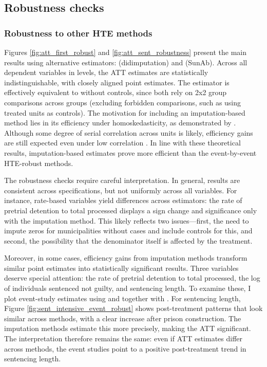 \subsection*{Robustness checks}

\subsubsection*{Robustness to other HTE methods}

Figures \ref{fig:att_first_robust} and \ref{fig:att_sent_robustness} present the main results using alternative estimators: \cite{Borusyak-DIDImp} (didimputation) and \cite{SunAb} (SunAb). Across all dependent variables in levels, the ATT estimates are statistically indistinguishable, with closely aligned point estimates. The \cite{SunAb} estimator is effectively equivalent to \cite{Callaway} without controls, since both rely on 2x2 group comparisons across groups (excluding forbidden comparisons, such as using treated units as controls). The motivation for including an imputation-based method lies in its efficiency under homoskedasticity, as demonstrated by \cite{Borusyak-DIDImp}. Although some degree of serial correlation across units is likely, efficiency gains are still expected even under low correlation \citep{Chaise-ReviewDID}. In line with these theoretical results, imputation-based estimates prove more efficient than the event-by-event HTE-robust methods.

The robustness checks require careful interpretation. In general, results are consistent across specifications, but not uniformly across all variables. For instance, rate-based variables yield differences across estimators: the rate of pretrial detention to total processed displays a sign change and significance only with the imputation method. This likely reflects two issues—first, the need to impute zeros for municipalities without cases and include controls for this, and second, the possibility that the denominator itself is affected by the treatment. 

Moreover, in some cases, efficiency gains from imputation methods transform similar point estimates into statistically significant results. Three variables deserve special attention: the rate of pretrial detention to total processed, the log of individuals sentenced not guilty, and sentencing length. To examine these, I plot event-study estimates using \cite{Gardner} and \cite{Liu-FECT} together with \cite{Borusyak-DIDImp}. For sentencing length, Figure \ref{fig:sent_intensive_event_robust} shows post-treatment patterns that look similar across methods, with a clear increase after prison construction. The imputation methods estimate this more precisely, making the ATT significant. The interpretation therefore remains the same: even if ATT estimates differ across methods, the event studies point to a positive post-treatment trend in sentencing length.

